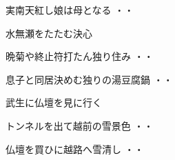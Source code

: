 \vspace{0.6cm}
\begin{shiika}実南天紅し娘は母となる
\hfill{・・}\end{shiika}
\vspace{0.6cm}
水無瀬をたたむ決心
\begin{shiika}晩菊や終止符打たん独り住み
\hfill{・・}\end{shiika}
\begin{shiika}息子と同居決めむ独りの湯豆腐鍋
\hfill{・・}\end{shiika}
\vspace{0.6cm}
武生に仏壇を見に行く
\begin{shiika}トンネルを出て越前の雪景色
\hfill{・・}\end{shiika}
\begin{shiika}仏壇を買ひに越路へ雪清し
\hfill{・・}\end{shiika}
